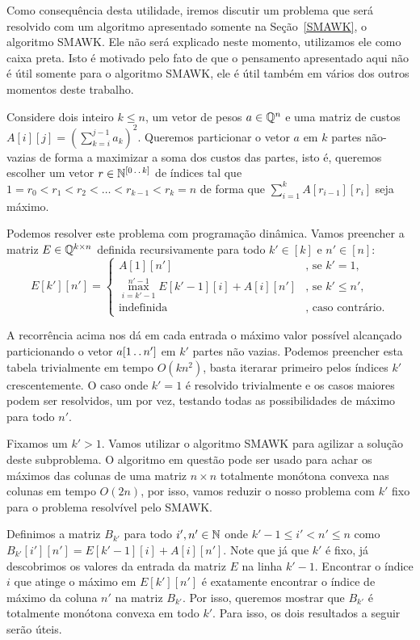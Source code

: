 Como consequência desta utilidade, iremos discutir um problema que será resolvido com um algoritmo apresentado somente na Seção~\ref{SMAWK}, o algoritmo SMAWK. Ele não será explicado neste momento, utilizamos ele como caixa preta. Isto é motivado pelo fato de que o pensamento apresentado aqui não é útil somente para o algoritmo SMAWK, ele é útil também em vários dos outros momentos deste trabalho.  

Considere dois inteiro $k \leq n$, um vetor de pesos $a \in \mathbb{Q}^n$ e uma matriz de custos $A[i][j] = \left(\sum\limits_{k=i}^{j-1} a_k\right)^2$. Queremos particionar o vetor $a$ em $k$ partes não-vazias de forma a maximizar a soma dos custos das partes, isto é, queremos escolher um vetor $r \in \mathbb{N}^{[0 \,.\,.\, k]}$ de índices tal que $1 = r_0 < r_1 < r_2 < \dots < r_{k-1} < r_k = n$ de forma que $\sum\limits_{i=1}^{k} A[r_{i-1}][r_i]$ seja máximo.

Podemos resolver este problema com programação dinâmica. Vamos preencher a matriz $E \in \mathbb{Q}^{k \times n}$ definida recursivamente para todo $k' \in [k]$ e $n' \in [n]$: 
$$ E[k'][n'] = \begin{cases}
    A[1][n']                                               & \text{, se } k'= 1 \text{,} \\[2pt]
    \max\limits_{i=k'-1}^{n'-1} E[k'-1][i] + A[i][n']     & \text{, se } k' \leq n' \text{,} \\[2pt]
    \text{indefinida }                                    & \text{, caso contrário.}
\end{cases} $$

A recorrência acima nos dá em cada entrada o máximo valor possível alcançado particionando o vetor $a[1 \,.\,.\, n']$ em $k'$ partes não vazias. Podemos preencher esta tabela trivialmente em tempo $O(kn^2)$, basta iterarar primeiro pelos índices $k'$ crescentemente. O caso onde $k' = 1$ é resolvido trivialmente e os casos maiores podem ser resolvidos, um por vez, testando todas as possibilidades de máximo para todo $n'$.  

Fixamos um $k' > 1$. Vamos utilizar o algoritmo SMAWK para agilizar a solução deste subproblema. O algoritmo em questão pode ser usado para achar os máximos das colunas de uma matriz $n \times n$ totalmente monótona convexa nas colunas em tempo $O(2n)$, por isso, vamos reduzir o nosso problema com $k'$ fixo para o problema resolvível pelo SMAWK.  

Definimos a matriz $B_{k'}$ para todo $i',n' \in \mathbb{N}$ onde $k'-1 \leq i' < n' \leq n$ como $B_{k'}[i'][n'] = E[k'-1][i] + A[i][n']$. Note que já que $k'$ é fixo, já descobrimos os valores da entrada da matriz $E$ na linha $k'-1$. Encontrar o índice $i$ que atinge o máximo em $E[k'][n']$ é exatamente encontrar o índice de máximo da coluna $n'$ na matriz $B_{k'}$. Por isso, queremos mostrar que $B_{k'}$ é totalmente monótona convexa em todo $k'$. Para isso, os dois resultados a seguir serão úteis. 

